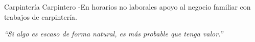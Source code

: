 \documentclass[%
	       doublesided,
	       paper=a4,
	       fontsize=10pt
	      ]{my-resume}
\begin{document}
{Carpintería}
{Carpintero}
{
-En horarios no laborales apoyo al negocio familiar con trabajos de carpintería.
}

\begin{center}

\vspace{2.5em}
\textit{``Si algo es escaso de forma natural, \newline es más probable que tenga valor.''}                                 %
\end{center}
%
\begin{comment}
    Perfil del profesionista

    El licenciado en Matemáticas Aplicadas y Computación es un profesionista capaz de utilizar las matemáticas y la computación de manera creativa para formular, analizar, diseñar, construir y automatizar soluciones a problemas reales. Durante su desempeño profesional ejercerá sus habilidades para actuar en equipos y adaptar métodos abstractos a la solución de problemas de orden práctico, así como a la modelación matemática y computacional de situaciones reales, con un pensamiento crítico, creativo e innovador de naturaleza inter y multidisciplinaria.

    Estará capacitado para desempeñar actividades como:
    Identificar problemas y proponer soluciones. Proponer constructos matemáticos-computacionales. Participar en equipos de investigación aplicada y documental en tecnologías de información, comunicación y desarrollo de software y hardware, para apoyar los procesos y servicios de una organización. Ofrecer consultoría en áreas físico-matemáticas y económico-administrativas, en inteligencia artificial, en tecnologías de la información, sistemas y programas de última generación. Atender las necesidades empresariales a través de la capacitación o actualización académicas. Desarrollar y manejar software: de sistema, de aplicación para resolver necesidades específicas de negocio, científico, empotrado, de línea de producto, así como aplicaciones de inteligencia artificial basadas en la Web y dispositivos móviles. Desempeñar la docencia en niveles de pregrado.
    Objetivo

    Desarrollar en el alumno la capacidad de aplicar creativamente las matemáticas y técnicas computacionales para analizar, evaluar y resolver problemas por medio de modelos en diversas áreas de conocimiento.
    Características y habilidades recomendables del estudiante

    El estudiante de Matemáticas Aplicadas y Computación debe poseer los conocimientos necesarios del área físico-matemática, contar con facilidad y razonamiento lógico, capacidad de concentración, de análisis y síntesis; tener una gran creatividad y curiosidad científica, así como de disciplina y constancia en el estudio y habilidad para el trabajo en equipo.
\end{comment}
\end{document}
